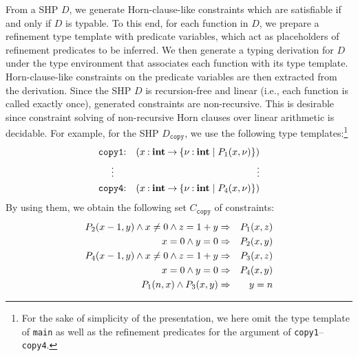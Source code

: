From a SHP \(D\), we generate Horn-clause-like constraints which are 
satisfiable if and only if \(D\) is typable.  To this end, for each 
function in \(D\), we prepare a refinement type template with predicate 
variables, which act as placeholders of refinement predicates to be 
inferred.  We then generate a typing derivation for \(D\) under the type 
environment that associates each function with its type template.  
Horn-clause-like constraints on the predicate variables are then 
extracted from the derivation.  Since the SHP \(D\) is recursion-free 
and linear (i.e., each function is called exactly once), generated 
constraints are non-recursive.  This is desirable since constraint 
solving of non-recursive Horn clauses over linear arithmetic is 
decidable.  For example, for the SHP \(D_{\texttt{copy}}\), we use the 
following type templates:\footnote{For the sake of simplicity of the 
presentation, we here omit the type template of \texttt{main} as well as 
the refinement predicates for the argument of 
\texttt{copy1}--\texttt{copy4}.}
\begin{eqnarray*}
\texttt{copy1}&\mathbin{:}&(x\mathbin{:}{\mathbf{int}}\mathbin{\rightarrow}{\{{\nu\mathbin{:}\mathbf{int} \mid P_1(x,\nu)}\}}) \\
\vdots\quad &&\qquad\qquad \vdots \\
\texttt{copy4}&\mathbin{:}&(x\mathbin{:}{\mathbf{int}}\mathbin{\rightarrow}{\{{\nu\mathbin{:}\mathbf{int} \mid P_4(x,\nu)}\}})
\end{eqnarray*}
By using them, we obtain the following set \(C_{\texttt{copy}}\) of 
constraints:
\begin{eqnarray*}
P_2(x-1,y) \land x\neq0 \land z=1+y &\Rightarrow& P_1(x,z) \\
x=0 \land y=0 &\Rightarrow& P_2(x,y) \\
P_4(x-1,y) \land x\neq0 \land z=1+y &\Rightarrow& P_3(x,z) \\
x=0 \land y=0 &\Rightarrow& P_4(x,y) \\
P_1(n,x) \land P_3(x,y) &\Rightarrow& y=n
\end{eqnarray*}

